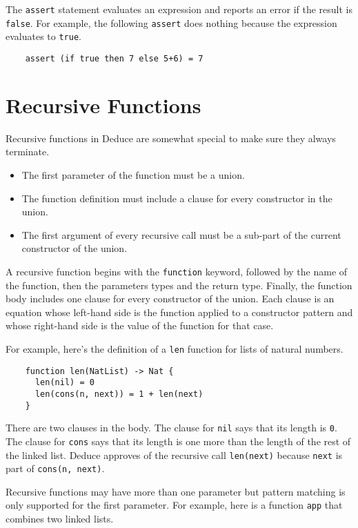 \documentclass[12pt]{article}
\begin{document}
The \texttt{assert} statement evaluates an expression and reports an
error if the result is \texttt{false}. For example, the following
\texttt{assert} does nothing because the expression evaluates to
\texttt{true}.

\begin{verbatim}
    assert (if true then 7 else 5+6) = 7
\end{verbatim}

\section{Recursive Functions}

Recursive functions in Deduce are somewhat special to make sure they
always terminate.

\begin{itemize}
\item The first parameter of the function must be a union.
\item The function definition must include a clause for every
  constructor in the union.
\item The first argument of every recursive call must be a sub-part of
  the current constructor of the union.
\end{itemize}

A recursive function begins with the \texttt{function} keyword,
followed by the name of the function, then the parameters types and
the return type. Finally, the function body includes one clause for
every constructor of the union. Each clause is an equation whose
left-hand side is the function applied to a constructor pattern and
whose right-hand side is the value of the function for that case.

For example, here's the definition of a \texttt{len} function for
lists of natural numbers.

\begin{verbatim}
    function len(NatList) -> Nat {
      len(nil) = 0
      len(cons(n, next)) = 1 + len(next)
    }
\end{verbatim}

There are two clauses in the body. The clause for \texttt{nil} says
that its length is \texttt{0}.  The clause for \texttt{cons} says that
its length is one more than the length of the rest of the linked list.
Deduce approves of the recursive call \texttt{len(next)} because
\texttt{next} is part of \texttt{cons(n, next)}.

Recursive functions may have more than one parameter but pattern
matching is only supported for the first parameter. For example, here
is a function \texttt{app} that combines two linked lists.
\end{document}
